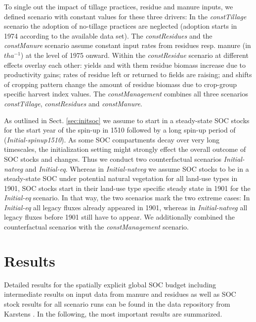 \documentclass[gc, manuscript]{copernicus}
\begin{document}
To single out the impact of tillage practices, residue and manure inputs, we defined scenario with constant values for these three drivers: In the \textit{constTillage} scenario the adoption of no-tillage practices are neglected (adoption starts in 1974 according to the available data set). The \textit{constResidues} and the \textit{constManure} scenario assume constant input rates from residues resp. manure (in \(\unit{t ha^{-1}}\)) at the level of 1975 onward. Within the \textit{constResidue} scenario at different effects overlay each other: yields and with them residue biomass increase due to productivity gains; rates of residue left or returned to fields are raising; and shifts of cropping pattern change the amount of residue biomass due to crop-group specific harvest index values. The \textit{constManagement} combines all three scenarios \textit{constTillage}, \textit{constResidues} and \textit{constManure}.

As outlined in Sect. \ref{sec:initsoc} we assume to start in a steady-state SOC stocks for the start year of the spin-up in 1510 followed by a long spin-up period of (\textit{Initial-spinup1510}). As some SOC compartments decay over very long timescales, the initialization setting might strongly effect the overall outcome of SOC stocks and changes. Thus we conduct two counterfactual scenarios \textit{Initial-natveg} and \textit{Initial-eq}. Whereas in \textit{Initial-natveg} we assume SOC stocks to be in a steady-state SOC under potential natural vegetation for all land-use types in 1901, SOC stocks start in their land-use type specific steady state in 1901 for the \textit{Initial-eq} scenario. In that way, the two scenarios mark the two extreme cases: In \textit{Initial-eq} all legacy fluxes already appeared in 1901, whereas in \textit{Initial-natveg} all legacy fluxes before 1901 still have to appear. We additionally combined the counterfactual scenarios with the \textit{constManagement} scenario.
\newpage

\hypertarget{results}{%
\section{Results}\label{results}}

Detailed results for the spatially explicit global SOC budget including intermediate results on input data from manure and residues as well as SOC stock results for all scenario runs can be found in the data repository from Karstens \citeyearpar{karstens_model_2020}. In the following, the most important results \citep[see][ for post-processing scripts]{karstens_result_2020} are summarized.
\end{document}
